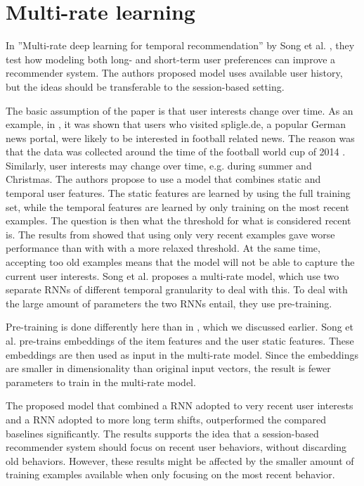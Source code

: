 \section{Multi-rate learning}
In ''Multi-rate deep learning for temporal recommendation'' by Song et al. \cite{Song:2016:MDL:2911451.2914726}, they test how modeling both long- and short-term user preferences can improve a recommender system. The authors proposed model uses available user history, but the ideas should be transferable to the session-based setting.

The basic assumption of the paper is that user interests change over time. As an example, in \cite{Elkahky:2015:MDL:2736277.2741667}, it was shown that users who visited spligle.de, a popular German news portal, were likely to be interested in football related news. The reason was that the data was collected around the time of the football world cup of 2014 \cite{Song:2016:MDL:2911451.2914726}. Similarly, user interests may change over time, e.g. during summer and Christmas. The authors propose to use a model that combines static and temporal user features. The static features are learned by using the full training set, while the temporal features are learned by only training on the most recent examples. The question is then what the threshold for what is considered recent is. The results from \cite{DBLP:journals/corr/TanXL16} showed that using only very recent examples gave worse performance than with with a more relaxed threshold. At the same time, accepting too old examples means that the model will not be able to capture the current user interests. Song et al. proposes a multi-rate model, which use two separate RNNs of different temporal granularity to deal with this.  To deal with the large amount of parameters the two RNNs entail, they use pre-training.

Pre-training is done differently here than in \cite{DBLP:journals/corr/TanXL16}, which we discussed earlier. Song et al. pre-trains embeddings of the item features and the user static features. These embeddings are then used as input in the multi-rate model. Since the embeddings are smaller in dimensionality than original input vectors, the result is fewer parameters to train in the multi-rate model.

The proposed model that combined a RNN adopted to very recent user interests and a RNN adopted to more long term shifts, outperformed the compared baselines significantly. The results supports the idea that a session-based recommender system should focus on recent user behaviors, without discarding old behaviors. However, these results might be affected by the smaller amount of training examples available when only focusing on the most recent behavior.


